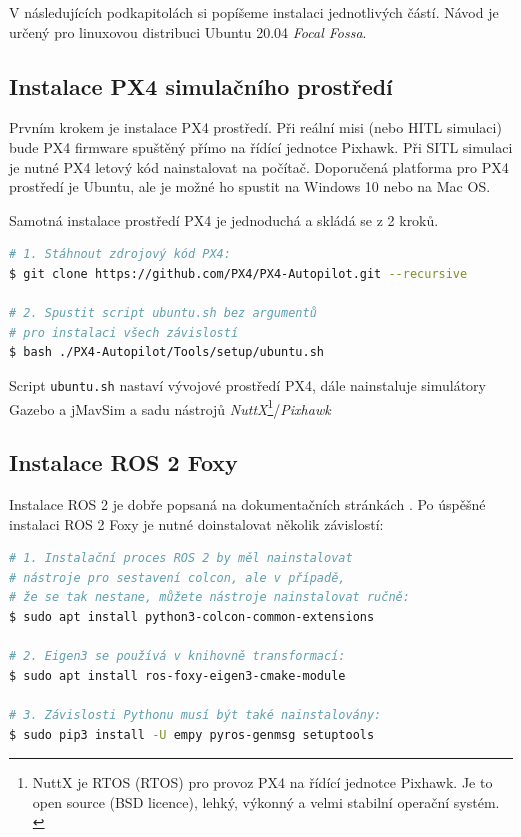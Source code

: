 V následujících podkapitolách si popíšeme instalaci jednotlivých částí. Návod je určený pro linuxovou distribuci Ubuntu 20.04 \textit{Focal Fossa}.

\subsection{Instalace PX4 simulačního prostředí}

Prvním krokem je instalace PX4 prostředí. Při reální misi (nebo \acs{HITL} simulaci) bude PX4 firmware spuštěný přímo na řídící jednotce Pixhawk. Při \acs{SITL} simulaci je nutné PX4 letový kód nainstalovat na počítač. Doporučená platforma pro PX4 prostředí je Ubuntu, ale je možné ho spustit na Windows 10 nebo na Mac OS.

Samotná instalace prostředí PX4 je jednoduchá a skládá se z 2 kroků. \cite{INSTALL1}

\begin{lstlisting}[language=bash]
# 1. Stáhnout zdrojový kód PX4:
$ git clone https://github.com/PX4/PX4-Autopilot.git --recursive
 
# 2. Spustit script ubuntu.sh bez argumentů
# pro instalaci všech závislostí
$ bash ./PX4-Autopilot/Tools/setup/ubuntu.sh
\end{lstlisting}

Script \texttt{ubuntu.sh} nastaví vývojové prostředí PX4, dále nainstaluje simulátory Gazebo a jMavSim a sadu nástrojů \textit{NuttX}\footnote{NuttX je \acs{RTOS} (\acl{RTOS}) pro provoz PX4 na řídící jednotce Pixhawk. Je to open source (BSD licence), lehký, výkonný a velmi stabilní operační systém. \cite{PX4main}}/\textit{Pixhawk}

\subsection{Instalace ROS 2 Foxy}

Instalace ROS 2 je dobře popsaná na dokumentačních stránkách \cite{ROS2INSTALL}. Po úspěšné instalaci ROS 2 Foxy je nutné doinstalovat několik závislostí:

\begin{lstlisting}[language=bash]
# 1. Instalační proces ROS 2 by měl nainstalovat 
# nástroje pro sestavení colcon, ale v případě, 
# že se tak nestane, můžete nástroje nainstalovat ručně:
$ sudo apt install python3-colcon-common-extensions
 
# 2. Eigen3 se používá v knihovně transformací:
$ sudo apt install ros-foxy-eigen3-cmake-module
 
# 3. Závislosti Pythonu musí být také nainstalovány:
$ sudo pip3 install -U empy pyros-genmsg setuptools
\end{lstlisting}

